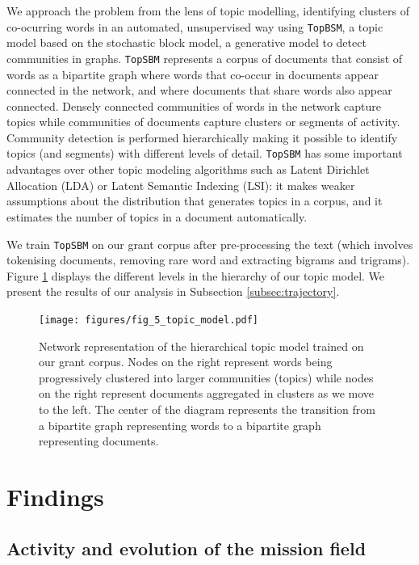 \documentclass[11pt]{article}
\begin{document}
We approach the problem from the lens of topic modelling, identifying clusters of co-ocurring words in an automated, unsupervised way using \texttt{TopBSM}, a topic model based on the stochastic block model, a generative model to detect communities in graphs. \texttt{TopSBM} represents a corpus of documents that consist of words as a bipartite graph where words that co-occur in documents appear connected in the network, and where documents that share words also appear connected. Densely connected communities of words in the network capture topics while communities of documents capture clusters or segments of activity. Community detection is performed hierarchically making it possible to identify topics (and segments) with different levels of detail. \texttt{TopSBM} has some important advantages over other topic modeling algorithms such as Latent Dirichlet Allocation (LDA) or Latent Semantic Indexing (LSI): it makes weaker assumptions about the distribution that generates topics in a corpus, and it estimates the number of topics in a document automatically. 

We train \texttt{TopSBM} on our grant corpus after pre-processing the text (which involves tokenising documents, removing rare word and extracting bigrams and trigrams). Figure \ref{fig:topic_model} displays the different levels in the hierarchy of our topic model. We present the results of our analysis in Subsection \ref{subsec:trajectory}.

\begin{figure}[!ht]
    \centering
    \texttt{[image: figures/fig\_5\_topic\_model.pdf]}
    \caption{Network representation of the hierarchical topic model trained on our grant corpus. Nodes on the right represent words being progressively clustered into larger communities (topics) while nodes on the right represent documents aggregated in clusters as we move to the left. The center of the diagram represents the transition from a bipartite graph representing words to a bipartite graph representing documents.}
    \label{fig:topic_model}
\end{figure}
 
\section{Findings}
\label{sec:findings}

\subsection{Activity and evolution of the mission field}
\end{document}
